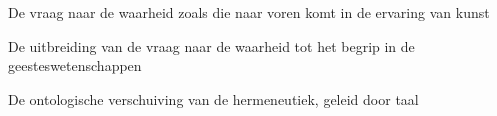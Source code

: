 \documentclass[11pt, showtrims]{memoir}
\makeatletter
\newcommand{\parttitle}{}
\let\latexpart\part
\renewcommand\part{%
  \@ifstar{\@spartstar}{\@spartnostar}%
}
\newcommand\@spartnostar[1]{%
  \gdef\parttitle{#1}%
  \latexpart{#1}%
}
\newcommand\@spartstar[1]{%
  \gdef\parttitle{#1}%
  \latexpart*{#1}%
}
\makeatother
\begin{document}
\raggedbottom %
\normalfont

\setcounter{tocdepth}{3}
\frontmatter
\tableofcontents



\mainmatter

\part{De vraag naar de waarheid zoals die naar voren komt in de ervaring van kunst}



\part{De uitbreiding van de vraag naar de waarheid tot het begrip in de geesteswetenschappen}
% 


\part{De ontologische verschuiving van de hermeneutiek, geleid door taal}

\backmatter
\end{document}
